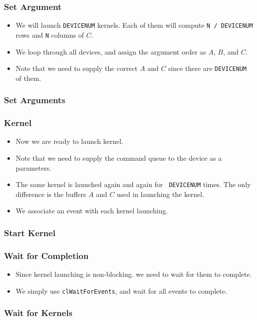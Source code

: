 \documentclass{beamer}
\begin{document}
\begin{frame}
  \frametitle{Set Argument}
  \begin{itemize}
    \item We will launch {\tt DEVICENUM} kernels.  Each of them will
      compute {\tt N / DEVICENUM} rows and {\tt N} columns of $C$.
    \item We loop through all devices, and assign the argument order
      as $A$, $B$, and $C$.
    \item Note that we need to supply the correct $A$ and $C$ since
      there are {\tt DEVICENUM} of them.
  \end{itemize}
\end{frame}

\begin{frame}
  \frametitle{Set Arguments}
\end{frame}

\begin{frame}
  \frametitle{Kernel}
  \begin{itemize}
    \item Now we are ready to launch kernel.
    \item Note that we need to supply the command queue to the device
      as a parameters.
    \item The same kernel is launched again and again for {\tt
      DEVICENUM} times.  The only difference is the buffers $A$ and
      $C$ used in launching the kernel.
    \item We associate an event with each kernel launching.
  \end{itemize}
\end{frame}

\begin{frame}
  \frametitle{Start Kernel}
\end{frame}

\begin{frame}
  \frametitle{Wait for Completion}
  \begin{itemize}
    \item Since kernel launching is non-blocking. we need to wait for
      them to complete.
    \item We simply use {\tt clWaitForEvents}, and wait for all events
      to complete.
  \end{itemize}
\end{frame}
\begin{frame}
  \frametitle{Wait for Kernels}
\end{frame}
\end{document}
